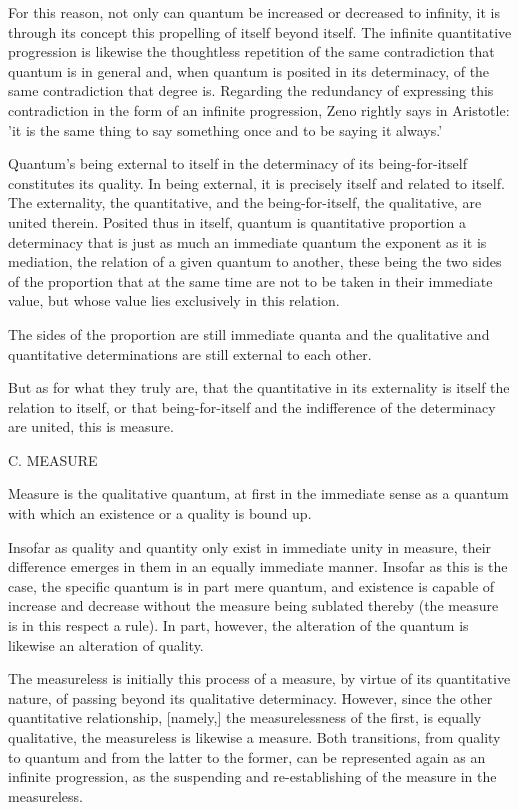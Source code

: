     For this reason, not only can quantum be increased or decreased to infinity,
    it is through its concept this propelling of itself beyond itself.
    The infinite quantitative progression is likewise the thoughtless
    repetition of the same contradiction that quantum is in general and,
    when quantum is posited in its determinacy, of the same contradiction that degree is.
    Regarding the redundancy of expressing this contradiction in
    the form of an infinite progression, Zeno rightly says in Aristotle:
    'it is the same thing to say something once and to be saying it always.'

Quantum's being external to itself in the determinacy of
its being-for-itself constitutes its quality.
In being external, it is precisely itself and related to itself.
The externality, the quantitative, and
the being-for-itself, the qualitative, are united therein.
Posited thus in itself, quantum is quantitative proportion
a determinacy that is just as much an immediate quantum
the exponent as it is mediation,
the relation  of a given quantum to another,
these being the two sides of the proportion that
at the same time are not to be taken in their immediate value,
but whose value lies exclusively in this relation.

The sides of the proportion are still immediate quanta and
the qualitative and quantitative determinations are
still external to each other.

But as for what they truly are,
that the quantitative in its externality is itself the relation to itself, or
that being-for-itself and the indifference of the determinacy are united,
this is measure.

C. MEASURE

Measure is the qualitative quantum,
at first in the immediate sense as a quantum
with which an existence or a quality is bound up.

Insofar as quality and quantity only exist in immediate unity in measure,
their difference emerges in them in an equally immediate manner.
Insofar as this is the case, the specific quantum is in part mere quantum, and
existence is capable of increase and decrease without the measure
being sublated thereby (the measure is in this respect a rule).
In part, however, the alteration of the quantum is
likewise an alteration of quality.

The measureless is initially this process of a measure,
by virtue of its quantitative nature,
of passing beyond its qualitative determinacy.
However, since the other quantitative relationship, [namely,]
the measurelessness of the first, is equally qualitative,
the measureless is likewise a measure.
Both transitions, from quality to quantum and
from the latter to the former,
can be represented again as an infinite progression,
as the suspending and re-establishing of
the measure in the measureless.

